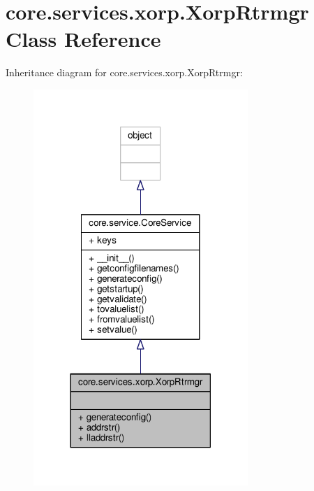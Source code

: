 \hypertarget{classcore_1_1services_1_1xorp_1_1_xorp_rtrmgr}{\section{core.\+services.\+xorp.\+Xorp\+Rtrmgr Class Reference}
\label{classcore_1_1services_1_1xorp_1_1_xorp_rtrmgr}
}


Inheritance diagram for core.\+services.\+xorp.\+Xorp\+Rtrmgr\+:
\nopagebreak
\begin{figure}[H]
\begin{center}
\leavevmode
\includegraphics[width=230pt]{classcore_1_1services_1_1xorp_1_1_xorp_rtrmgr__inherit__graph}
\end{center}
\end{figure}


